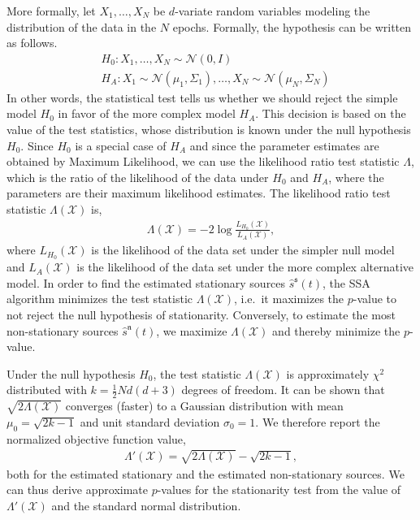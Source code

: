 \documentclass{article}
\newcommand{\1}{\ensuremath{\mathds{1}}}
\newcommand{\s}{\ensuremath{\mathfrak{s}}}
\newcommand{\n}{\ensuremath{\mathfrak{n}}}
\newcommand{\0}{\ensuremath{0}}
\begin{document}
\begin{appendices}
More formally, let $X_1, \ldots, X_N$ be $d$-variate random variables
modeling the distribution of the data in the $N$ epochs. Formally, the hypothesis can 
be written as follows.
\begin{align*}
	& H_0 : X_1, \ldots, X_N \sim \mathcal{N}(0, I) \\
	& H_A : X_1 \sim \mathcal{N}(\mu_1, \Sigma_1), \ldots, X_N \sim \mathcal{N}(\mu_N, \Sigma_N)
\end{align*}
In other words, the statistical test tells us whether we 
should reject the simple model $H_0$ in favor of the more complex model $H_A$. This decision 
is based on the value of the test statistics, whose distribution is known under the null hypothesis 
$H_0$. Since $H_0$ is a special case of $H_A$ and since the parameter estimates are obtained by 
Maximum Likelihood, we can use the likelihood ratio test statistic $\Lambda$,
which is the ratio of the likelihood of the data under $H_0$ and $H_A$, where the parameters are
their maximum likelihood estimates. 
The likelihood ratio test statistic $\Lambda(\mathcal{X})$ is, 
\begin{align} 
\label{eq:teststat}
  \Lambda(\mathcal{X}) = -2 \log \frac{L_{H_0}(\mathcal{X})}{ L_A(\mathcal{X})},
\end{align}
where $L_{H_0}(\mathcal{X})$ is the likelihood of the data set under the simpler null model and 
$L_A(\mathcal{X})$ is the likelihood of the data set under the more complex alternative model. In order
to find the estimated stationary sources $\hat{s}^\s(t)$, the SSA algorithm minimizes the test 
statistic $\Lambda(\mathcal{X})$, i.e.~it maximizes the $p$-value to not reject the null 
hypothesis of stationarity. Conversely, to estimate the most non-stationary sources  
$\hat{s}^\n(t)$, we maximize $\Lambda(\mathcal{X})$ and thereby minimize the $p$-value.

Under the null hypothesis $H_0$, the test statistic $\Lambda(\mathcal{X})$ is approximately $\chi^2$ distributed with 
$k = \frac{1}{2} N d (d+3)$ degrees of freedom. It can be shown that 
$\sqrt{2 \Lambda(\mathcal{X})}$ converges (faster) to a Gaussian distribution 
with mean $\mu_0 = \sqrt{2 k - 1}$ and unit standard deviation $\sigma_0 = 1$. We therefore
report the normalized objective function value, 
\begin{align*}
	\Lambda'(\mathcal{X}) = \sqrt{2 \Lambda(\mathcal{X})} - \sqrt{2 k - 1}, 
\end{align*}
both for the estimated stationary and the estimated non-stationary sources. We can thus 
derive approximate $p$-values for the stationarity test from the value of $\Lambda'(\mathcal{X})$ 
and the standard normal distribution. 


\end{appendices}
\end{document}
